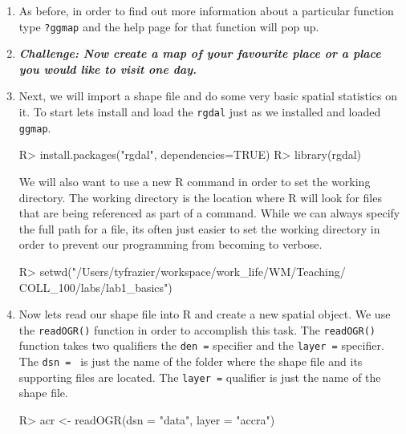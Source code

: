 \documentclass{article}
\newenvironment{Schunk}{}{}
\newcommand{\code}[1]{\texttt{#1}}
\newcommand{\pkg}[1]{\mbox{\texttt{#1}}}
\newcommand{\proglang}[1]{\textsf{#1}}
\begin{document}
\begin{enumerate}[leftmargin=15mm]
\begin{Schunk}
\begin{Sinput}
\end{Sinput}
\end{Schunk}

\item As before, in order to find out more information about a particular function type \code{?ggmap} and the help page for that function will pop up.

\item \textbf{\textit{Challenge:  Now create a map of your favourite place or a place you would like to visit one day.}}


\item Next, we will import a shape file and do some very basic spatial statistics on it.  To start lets install and load the \pkg{rgdal} just as we installed and loaded \pkg{ggmap}.

\begin{Schunk}
\begin{Sinput}
R> install.packages("rgdal", dependencies=TRUE)
R> library(rgdal)
\end{Sinput}
\end{Schunk}

We will also want to use a new \proglang{R} command in order to set the working directory.  The working directory is the location where \proglang{R} will look for files that are being referenced as part of a command.  While we can always specify the full path for a file, its often just easier to set the working directory in order to prevent our programming from becoming to verbose.

\begin{Schunk}
\begin{Sinput}
R> setwd("/Users/tyfrazier/workspace/work_life/WM/Teaching/
COLL_100/labs/lab1_basics")
\end{Sinput}
\end{Schunk}

\item Now lets read our shape file into \proglang{R} and create a new spatial object.  We use the \code{readOGR()} function in order to accomplish this task.  The \code{readOGR()} function takes two qualifiers the \code{den =} specifier and the \code{layer =} specifier.  The \code{dsn = } is just the name of the folder where the shape file and its supporting files are located.  The \code{layer =} qualifier is just the name of the shape file. 

\begin{Schunk}
\begin{Sinput}
R> acr <- readOGR(dsn = "data", layer = "accra")
\end{Sinput}
\end{Schunk}


\end{enumerate}
\end{document}
